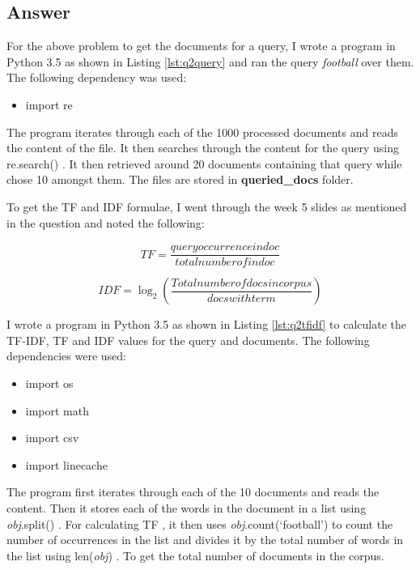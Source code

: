 \documentclass[letterpaper,11pt]{article}
\begin{document}
\subsection*{Answer}		

For the above problem to get the documents for a query, I wrote a program in Python 3.5 as shown in Listing \ref{lst:q2query} and ran the query \emph{football} over them. The following dependency was used:


\begin{itemize}
    \item import re
\end{itemize}

The program iterates through each of the 1000 processed documents and reads the content of the file. It then searches through the content for the query using re.search() \cite{regularref}. It then retrieved around 20 documents containing that query while chose 10 amongst them. The files are stored in \textbf{queried\_docs} folder.




To get the TF and IDF formulae, I went through the week 5 slides as mentioned in the question and noted the following:

\[ TF = \frac{query occurrence in doc}{total number of in doc } \]

\[ IDF = \log_2 \left( \frac{Total number of docs in corpus}{docs with term} \right) \]

I wrote a program in Python 3.5 as shown in Listing \ref {lst:q2tfidf} to calculate the TF-IDF, TF and IDF values for the query and documents. The following dependencies were used:


\begin{itemize}
    \item import os
    \item import math
    \item import csv
    \item import linecache	
\end{itemize}

The program first iterates through each of the 10 documents and reads the content. Then it stores each of the words in the document in a list using \emph{obj}.split() \cite{countingref}. For calculating TF , it then uses \emph{obj}.count(‘football’) \cite{countingref} to count the number of occurrences in the list and divides it by the total number of words in the list using len(\emph{obj}) \cite{countingref}. To get the total number of documents in the corpus.
\end{document}
